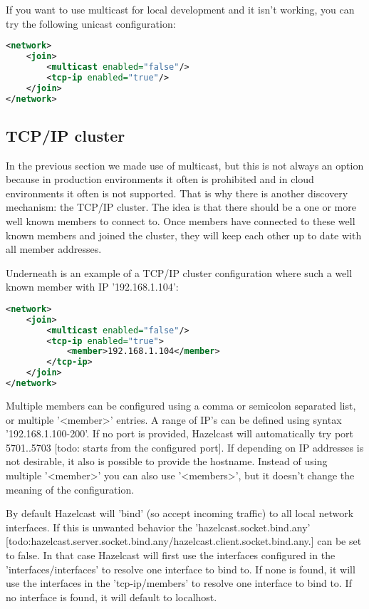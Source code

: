 If you want to use multicast for local development and it isn't working, you can try the following unicast configuration:
\begin{lstlisting}[language=xml]
<network>
    <join>
        <multicast enabled="false"/>
        <tcp-ip enabled="true"/>
    </join>
</network>
\end{lstlisting}

\subsection{TCP/IP cluster}
In the previous section we made use of multicast, but this is not always an option because in production environments it often is prohibited and in cloud environments it often is not supported. That is why there is another discovery mechanism: the TCP/IP cluster. The idea is that there should be a one or more well known members to connect to. Once members have connected to these well known members and joined the cluster, they will keep each other up to date with all member addresses.

Underneath is an example of a TCP/IP cluster configuration where such a well known member with IP '192.168.1.104':
\begin{lstlisting}[language=xml]
<network>
    <join>
        <multicast enabled="false"/>
        <tcp-ip enabled="true">
            <member>192.168.1.104</member> 
        </tcp-ip>
    </join>
</network>
\end{lstlisting}
Multiple members can be configured using a comma or semicolon separated list, or multiple '<member>' entries. A range of IP's can be defined using syntax '192.168.1.100-200'. If no port is provided, Hazelcast will automatically try port 5701..5703 [todo: starts from the configured port]. If depending on IP addresses is not desirable, it also is possible to provide the hostname. Instead of using multiple '<member>' you can also use '<members>', but it doesn't change the meaning of the configuration. 

By default Hazelcast will 'bind' (so accept incoming traffic) to all local network interfaces. If this is unwanted behavior the 'hazelcast.socket.bind.any' [todo:hazelcast.server.socket.bind.any/hazelcast.client.socket.bind.any.] can be set to false. In that case Hazelcast will first use the interfaces configured in the 'interfaces/interfaces' to resolve one interface to bind to. If none is found, it will use the interfaces in the 'tcp-ip/members' to resolve one interface to bind to. If no interface is found, it will default to localhost.

